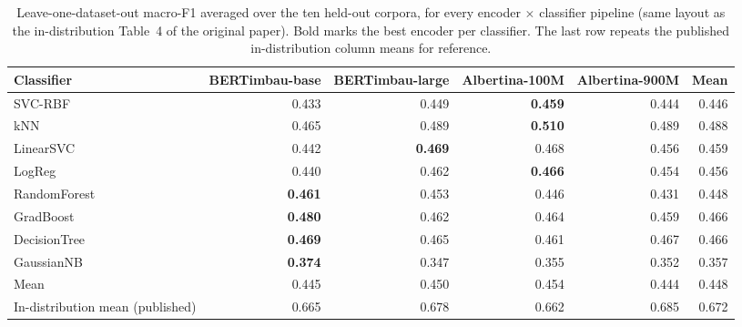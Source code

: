 \begin{table}[t]
\centering
\small
\caption{Leave-one-dataset-out macro-F1 averaged over the ten held-out corpora, for every encoder $\times$ classifier pipeline (same layout as the in-distribution Table~4 of the original paper). Bold marks the best encoder per classifier. The last row repeats the published in-distribution column means for reference.}
\label{tab:lodo-by-pipeline}
\begin{tabular}{lrrrrr}
\toprule
Classifier & BERTimbau-base & BERTimbau-large & Albertina-100M & Albertina-900M & Mean \\
\midrule
SVC-RBF & 0.433 & 0.449 & \textbf{0.459} & 0.444 & 0.446 \\
kNN & 0.465 & 0.489 & \textbf{0.510} & 0.489 & 0.488 \\
LinearSVC & 0.442 & \textbf{0.469} & 0.468 & 0.456 & 0.459 \\
LogReg & 0.440 & 0.462 & \textbf{0.466} & 0.454 & 0.456 \\
RandomForest & \textbf{0.461} & 0.453 & 0.446 & 0.431 & 0.448 \\
GradBoost & \textbf{0.480} & 0.462 & 0.464 & 0.459 & 0.466 \\
DecisionTree & \textbf{0.469} & 0.465 & 0.461 & 0.467 & 0.466 \\
GaussianNB & \textbf{0.374} & 0.347 & 0.355 & 0.352 & 0.357 \\
\midrule Mean & 0.445 & 0.450 & 0.454 & 0.444 & 0.448 \\
In-distribution mean (published) & 0.665 & 0.678 & 0.662 & 0.685 & 0.672 \\
\bottomrule
\end{tabular}
\end{table}
